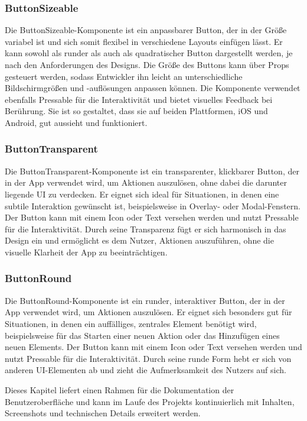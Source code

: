 \subsubsection{ButtonSizeable}
Die ButtonSizeable-Komponente ist ein anpassbarer Button, der in der Größe variabel ist und sich somit flexibel in verschiedene Layouts einfügen lässt. Er kann sowohl als runder als auch als quadratischer Button dargestellt werden, je nach den Anforderungen des Designs. Die Größe des Buttons kann über Props gesteuert werden, sodass Entwickler ihn leicht an unterschiedliche Bildschirmgrößen und -auflösungen anpassen können. Die Komponente verwendet ebenfalls Pressable für die Interaktivität und bietet visuelles Feedback bei Berührung. Sie ist so gestaltet, dass sie auf beiden Plattformen, iOS und Android, gut aussieht und funktioniert.

\subsubsection{ButtonTransparent}
Die ButtonTransparent-Komponente ist ein transparenter, klickbarer Button, der in der App verwendet wird, um Aktionen auszulösen, ohne dabei die darunter liegende UI zu verdecken. Er eignet sich ideal für Situationen, in denen eine subtile Interaktion gewünscht ist, beispielsweise in Overlay- oder Modal-Fenstern. Der Button kann mit einem Icon oder Text versehen werden und nutzt Pressable für die Interaktivität. Durch seine Transparenz fügt er sich harmonisch in das Design ein und ermöglicht es dem Nutzer, Aktionen auszuführen, ohne die visuelle Klarheit der App zu beeinträchtigen.

\subsubsection{ButtonRound}
Die ButtonRound-Komponente ist ein runder, interaktiver Button, der in der App verwendet wird, um Aktionen auszulösen. Er eignet sich besonders gut für Situationen, in denen ein auffälliges, zentrales Element benötigt wird, beispielsweise für das Starten einer neuen Aktion oder das Hinzufügen eines neuen Elements. Der Button kann mit einem Icon oder Text versehen werden und nutzt Pressable für die Interaktivität. Durch seine runde Form hebt er sich von anderen UI-Elementen ab und zieht die Aufmerksamkeit des Nutzers auf sich.

\vspace{1em}
\noindent
Dieses Kapitel liefert einen Rahmen für die Dokumentation der Benutzeroberfläche und kann im Laufe des Projekts kontinuierlich mit Inhalten, Screenshots und technischen Details erweitert werden.

